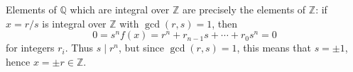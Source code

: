 Elements of $\mathbb{Q}$ which are integral over $\mathbb{Z}$ are precisely
the elements of $\mathbb{Z}$: if $x = r/s$ is integral over $\mathbb{Z}$ with
$\gcd(r, s) = 1$, then
\[ 0 = s^nf(x) = r^n + r_{n-1}s + \cdots + r_0s^n = 0 \]
for integers $r_i$. Thus $s\mid r^n$, but since $\gcd(r, s) = 1$, this
means that $s=\pm 1$, hence $x = \pm r \in \mathbb{Z}$.
